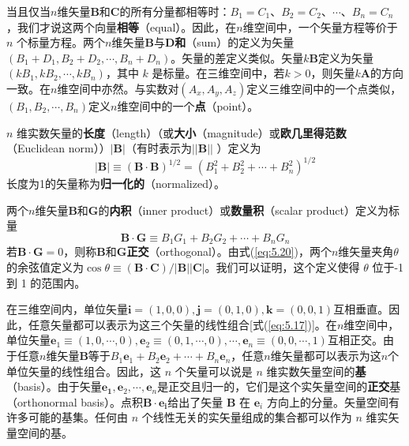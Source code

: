     当且仅当$n$维矢量$\mathbf{B}$和$\mathbf{C}$的所有分量都相等时：$B_1 = C_1$、$B_2 = C_2$、$\cdots$、$B_n = C_n$，我们才说这两个向量\textbf{相等}（equal）。因此，在$n$维空间中，一个矢量方程等价于 $n$ 个标量方程。两个$n$维矢量$\mathbf{B}$与$\mathbf{D}$\textbf{和}（sum）的定义为矢量$\left(B_1+D_1,B_2+D_2,\cdots,B_n+D_n\right)$。矢量的差定义类似。矢量$k\mathbf{B}$定义为矢量$\left(kB_1,kB_2,\cdots,kB_n\right)$，其中 $k$ 是标量。在三维空间中，若$k>0$，则矢量$k\mathbf{A}$的方向一致。在$n$维空间中亦然。与实数对$\left(A_x,A_y,A_z\right)$定义三维空间中的一个点类似，$\left(B_1,B_2,\cdots,B_n\right)$定义$n$维空间中的一个\textbf{点}（point）。

    $n$ 维实数矢量的\textbf{长度}（length）（或\textbf{大小}（magnitude）或\textbf{欧几里得范数}（Euclidean norm））$\left|\mathbf{B}\right|$（有时表示为$\left|\left|\mathbf{B}\right|\right|$ ）定义为
    \begin{equation*}
        \left|\mathbf{B}\right| \equiv \left(\mathbf{B}\cdot\mathbf{B}\right)^{1/2} = \left(B_1^2 + B_2^2 + \cdots + B_n^2\right)^{1/2}
    \end{equation*}
    长度为1的矢量称为\textbf{归一化的}（normalized）。

    两个$n$维矢量$\mathbf{B}$和$\mathbf{G}$的\textbf{内积}（inner product）或\textbf{数量积}（scalar product）定义为标量
    \begin{equation*}
        \mathbf{B}\cdot\mathbf{G} \equiv B_1G_1 + B_2G_2 + \cdots + B_nG_n
    \end{equation*}
    若$\mathbf{B}\cdot\mathbf{G}=0$，则称$\mathbf{B}$和$\mathbf{G}$\textbf{正交}（orthogonal）。由式(\ref{eq:5.20})，两个$n$维矢量夹角$\theta$的余弦值定义为$\cos\theta \equiv \left(\mathbf{B}\cdot\mathbf{C}\right)/\left|\mathbf{B}\right|\left|\mathbf{C}\right|$。我们可以证明，这个定义使得 $\theta$ 位于-1 到 1 的范围内。

    在三维空间内，单位矢量$\mathbf{i} = \left(1,0,0\right), \mathbf{j} = \left(0,1,0\right), \mathbf{k} = \left(0,0,1\right)$互相垂直。因此，任意矢量都可以表示为这三个矢量的线性组合[式(\ref{eq:5.17})]。在$n$维空间中，单位矢量$\mathbf{e}_1 \equiv \left(1,0,\cdots,0\right), \mathbf{e}_2 \equiv \left(0,1,\cdots,0\right), \cdots, \mathbf{e}_n \equiv \left(0,0,\cdots,1\right)$互相正交。由于任意$n$维矢量$\mathbf{B}$等于$B_1\mathbf{e}_1 + B_2\mathbf{e}_2 + \cdots + B_n\mathbf{e}_n$，任意$n$维矢量都可以表示为这$n$个单位矢量的线性组合。因此，这 $n$ 个矢量可以说是 $n$ 维实数矢量空间的\textbf{基}（basis）。由于矢量$\mathbf{e_1}, \mathbf{e}_2, \cdots, \mathbf{e}_n$是正交且归一的，它们是这个实矢量空间的\textbf{正交}基（orthonormal basis）。点积$\mathbf{B}\cdot\mathbf{e_i}$给出了矢量 $\mathbf{B}$ 在 $\mathbf{e}_i$ 方向上的分量。矢量空间有许多可能的基集。任何由 $n$ 个线性无关的实矢量组成的集合都可以作为 $n$ 维实矢量空间的基。

